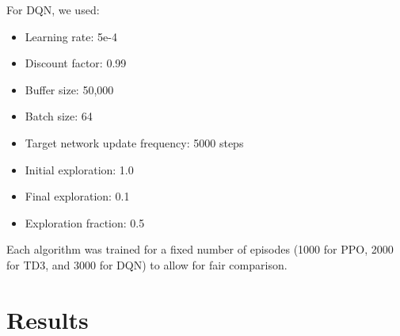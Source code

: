 \documentclass[12pt]{article}
\begin{document}

For DQN, we used:
\begin{itemize}
    \item Learning rate: 5e-4
    \item Discount factor: 0.99
    \item Buffer size: 50,000
    \item Batch size: 64
    \item Target network update frequency: 5000 steps
    \item Initial exploration: 1.0
    \item Final exploration: 0.1
    \item Exploration fraction: 0.5
\end{itemize}


Each algorithm was trained for a fixed number of episodes (1000 for PPO, 2000 for TD3, and 3000 for DQN) to allow for fair comparison.


\section{Results}
\end{document}
